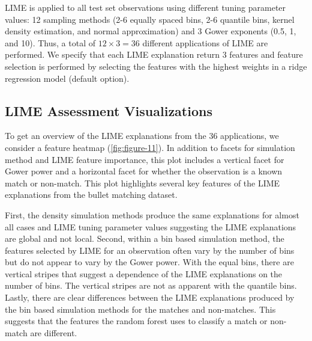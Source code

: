 \documentclass[AMS,STIX2COL]{WileyNJD-v2}\usepackage[]{graphicx}\usepackage[]{color}
\begin{document}
LIME is applied to all test set observations using different tuning parameter values: 12 sampling methods (2-6 equally spaced bins, 2-6 quantile bins, kernel density estimation, and normal approximation) and 3 Gower exponents (0.5, 1, and 10). Thus, a total of $12\times 3=36$ different applications of LIME are performed. We specify that each LIME explanation return 3 features and feature selection is performed by selecting the features with the highest weights in a ridge regression model (default option).







\subsection{LIME Assessment Visualizations} \label{bullet-assess-ex}

To get an overview of the LIME explanations from the 36 applications, we consider a feature heatmap (\autoref{fig:figure-11}). In addition to facets for simulation method and LIME feature importance, this plot includes a vertical facet for Gower power and a horizontal facet for whether the observation is a known match or non-match. This plot highlights several key features of the LIME explanations from the bullet matching dataset.

First, the density simulation methods produce the same explanations for almost all cases and LIME tuning parameter values suggesting the LIME explanations are global and not local. Second, within a bin based simulation method, the features selected by LIME for an observation often vary by the number of bins but do not appear to vary by the Gower power. With the equal bins, there are vertical stripes that suggest a dependence of the LIME explanations on the number of bins. The vertical stripes are not as apparent with the quantile bins. Lastly, there are clear differences between the LIME explanations produced by the bin based simulation methods for the matches and non-matches. This suggests that the features the random forest uses to classify a match or non-match are different. 
\end{document}
